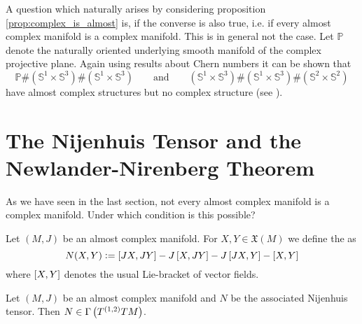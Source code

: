 A question which naturally arises by considering proposition \ref{prop:complex_is_almost} is, if the converse is also true, i.e. if every almost complex manifold is a complex manifold. This is in general not the case. Let $\mathbb{P}$ denote the naturally oriented underlying smooth manifold of the complex projective plane. Again using results about Chern numbers it can be shown that
\begin{equation}
\mathbb{P} \# (\mathbb{S}^1 \times \mathbb{S}^3) \# (\mathbb{S}^1 \times \mathbb{S}^3) \qquad \text{and} \qquad (\mathbb{S}^1 \times \mathbb{S}^3) \# (\mathbb{S}^1 \times \mathbb{S}^3) \# (\mathbb{S}^2 \times \mathbb{S}^2)
\end{equation}
\noindent have almost complex structures but no complex structure (see \cite[1627]{ven:chern:1966}). 

\section{The Nijenhuis Tensor and the Newlander-Nirenberg Theorem}
As we have seen in the last section, not every almost complex manifold is a complex manifold. Under which condition is this possible?

\begin{definition}
Let $(M,J)$ be an almost complex manifold. For $X,Y \in \mathfrak{X}(M)$ we define the  as
\begin{equation}
N(X,Y) := \sbr[0]{JX,JY} - J\sbr[0]{X,JY} - J\sbr[0]{JX,Y} - \sbr[0]{X,Y}
\end{equation}
\noindent where $\sbr[0]{X,Y}$ denotes the usual Lie-bracket of vector fields.
\end{definition}

\begin{proposition}
Let $(M,J)$ be an almost complex manifold and $N$ be the associated Nijenhuis tensor. Then $N \in \Gamma\del[1]{T^{(1,2)}TM}$.
\label{prop:nijenhuis_tensor}
\end{proposition}

